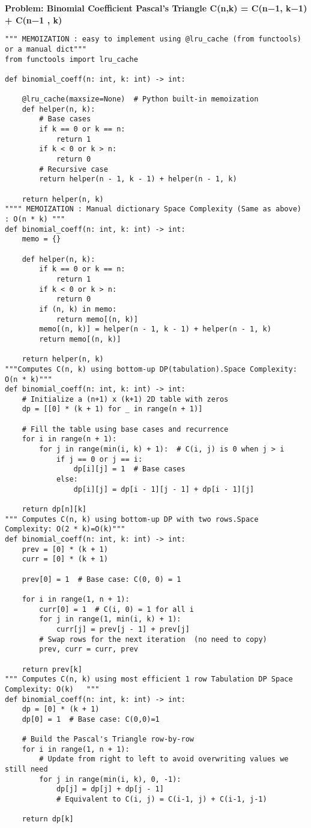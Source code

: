\noindent\textbf{Problem: Binomial Coefficient Pascal's Triangle C(n,k) = C(n−1, k−1) + C(n−1 , k)}
\begin{verbatim}
""" MEMOIZATION : easy to implement using @lru_cache (from functools) or a manual dict"""
from functools import lru_cache

def binomial_coeff(n: int, k: int) -> int:
   
    @lru_cache(maxsize=None)  # Python built-in memoization
    def helper(n, k):
        # Base cases
        if k == 0 or k == n:
            return 1
        if k < 0 or k > n:
            return 0
        # Recursive case
        return helper(n - 1, k - 1) + helper(n - 1, k)
        
    return helper(n, k)
"""" MEMOIZATION : Manual dictionary Space Complexity (Same as above) : O(n * k) """
def binomial_coeff(n: int, k: int) -> int:
    memo = {}

    def helper(n, k):
        if k == 0 or k == n:
            return 1
        if k < 0 or k > n:
            return 0
        if (n, k) in memo:
            return memo[(n, k)]
        memo[(n, k)] = helper(n - 1, k - 1) + helper(n - 1, k)
        return memo[(n, k)]
    
    return helper(n, k)
"""Computes C(n, k) using bottom-up DP(tabulation).Space Complexity: O(n * k)"""
def binomial_coeff(n: int, k: int) -> int:
    # Initialize a (n+1) x (k+1) 2D table with zeros
    dp = [[0] * (k + 1) for _ in range(n + 1)]

    # Fill the table using base cases and recurrence
    for i in range(n + 1):
        for j in range(min(i, k) + 1):  # C(i, j) is 0 when j > i
            if j == 0 or j == i:
                dp[i][j] = 1  # Base cases
            else:
                dp[i][j] = dp[i - 1][j - 1] + dp[i - 1][j]

    return dp[n][k]
""" Computes C(n, k) using bottom-up DP with two rows.Space Complexity: O(2 * k)=O(k)"""
def binomial_coeff(n: int, k: int) -> int:
    prev = [0] * (k + 1)
    curr = [0] * (k + 1)
    
    prev[0] = 1  # Base case: C(0, 0) = 1

    for i in range(1, n + 1):
        curr[0] = 1  # C(i, 0) = 1 for all i
        for j in range(1, min(i, k) + 1):
            curr[j] = prev[j - 1] + prev[j]
        # Swap rows for the next iteration  (no need to copy)
        prev, curr = curr, prev
    
    return prev[k]
""" Computes C(n, k) using most efficient 1 row Tabulation DP Space Complexity: O(k)   """
def binomial_coeff(n: int, k: int) -> int:
    dp = [0] * (k + 1)
    dp[0] = 1  # Base case: C(0,0)=1
    
    # Build the Pascal's Triangle row-by-row
    for i in range(1, n + 1):
        # Update from right to left to avoid overwriting values we still need
        for j in range(min(i, k), 0, -1):
            dp[j] = dp[j] + dp[j - 1]
            # Equivalent to C(i, j) = C(i-1, j) + C(i-1, j-1)
    
    return dp[k]
\end{verbatim}

